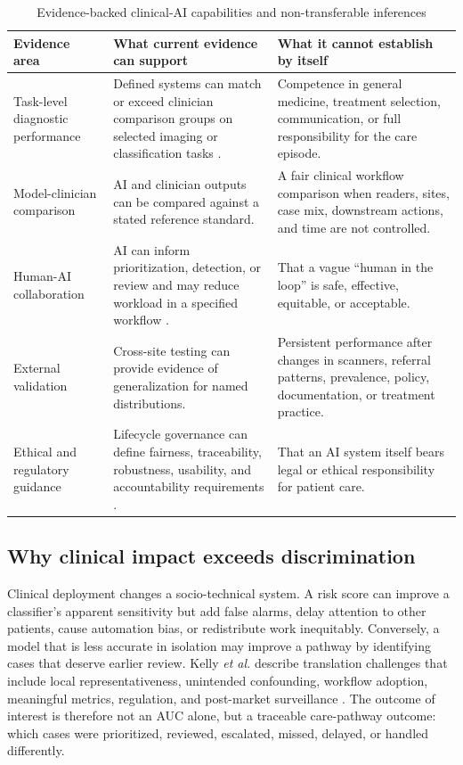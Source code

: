 \documentclass[conference]{IEEEtran}
\begin{document}
\begin{table}[t]
\caption{Evidence-backed clinical-AI capabilities and non-transferable inferences}
\label{tab:evidence}
\centering
\footnotesize
\begin{tabular}{p{} p{} p{}}
\toprule
\textbf{Evidence area} & \textbf{What current evidence can support} & \textbf{What it cannot establish by itself}\\
\midrule
Task-level diagnostic performance & Defined systems can match or exceed clinician comparison groups on selected imaging or classification tasks \cite{mckinney2020,shen2019}. & Competence in general medicine, treatment selection, communication, or full responsibility for the care episode.\\
Model-clinician comparison & AI and clinician outputs can be compared against a stated reference standard. & A fair clinical workflow comparison when readers, sites, case mix, downstream actions, and time are not controlled.\\
Human-AI collaboration & AI can inform prioritization, detection, or review and may reduce workload in a specified workflow \cite{mckinney2020,kelly2019}. & That a vague ``human in the loop'' is safe, effective, equitable, or acceptable.\\
External validation & Cross-site testing can provide evidence of generalization for named distributions. & Persistent performance after changes in scanners, referral patterns, prevalence, policy, documentation, or treatment practice.\\
Ethical and regulatory guidance & Lifecycle governance can define fairness, traceability, robustness, usability, and accountability requirements \cite{who2021,futureai2025}. & That an AI system itself bears legal or ethical responsibility for patient care.\\
\bottomrule
\end{tabular}
\end{table}

\subsection{Why clinical impact exceeds discrimination}

Clinical deployment changes a socio-technical system. A risk score can improve a classifier's apparent sensitivity but add false alarms, delay attention to other patients, cause automation bias, or redistribute work inequitably. Conversely, a model that is less accurate in isolation may improve a pathway by identifying cases that deserve earlier review. Kelly \textit{et al.} describe translation challenges that include local representativeness, unintended confounding, workflow adoption, meaningful metrics, regulation, and post-market surveillance \cite{kelly2019}. The outcome of interest is therefore not an AUC alone, but a traceable care-pathway outcome: which cases were prioritized, reviewed, escalated, missed, delayed, or handled differently.
\end{document}
